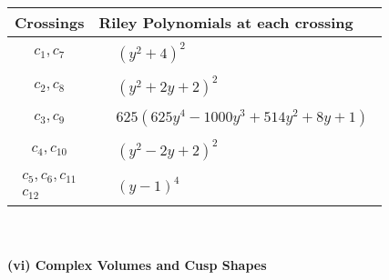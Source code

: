 \documentclass[1p]{elsarticle_modified}
\theoremstyle{definition}
\begin{document}
\begin{tabular}{m{50pt}|m{274pt}}
Crossings & \hspace{64pt}Riley Polynomials at each crossing \\
\hline $$\begin{aligned}c_{1},c_{7}\end{aligned}$$&$\begin{aligned}
&(y^2+4)^2
\end{aligned}$\\
\hline $$\begin{aligned}c_{2},c_{8}\end{aligned}$$&$\begin{aligned}
&(y^2+2 y+2)^2
\end{aligned}$\\
\hline $$\begin{aligned}c_{3},c_{9}\end{aligned}$$&$\begin{aligned}
&625(625 y^4-1000 y^3+514 y^2+8 y+1)
\end{aligned}$\\
\hline $$\begin{aligned}c_{4},c_{10}\end{aligned}$$&$\begin{aligned}
&(y^2-2 y+2)^2
\end{aligned}$\\
\hline $$\begin{aligned}c_{5},c_{6},c_{11}\\c_{12}\end{aligned}$$&$\begin{aligned}
&(y-1)^4
\end{aligned}$\\
\hline
\end{tabular}\\~\\
\newpage\flushleft \textbf{(vi) Complex Volumes and Cusp Shapes}
\end{document}

